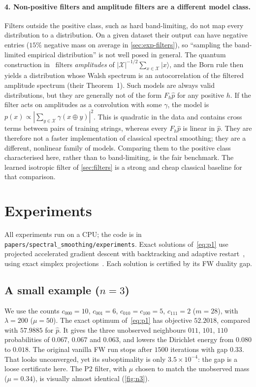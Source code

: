 \documentclass[11pt]{article}
\theoremstyle{definition}
\theoremstyle{remark}
\newcommand{\X}{\mathcal{X}}
\newcommand{\hp}{\hat p}
\begin{document}
\paragraph{4. Non-positive filters and amplitude filters are a different model class.}
Filters outside the positive class, such as hard band-limiting, do not map every distribution to a distribution. On a given dataset their output can have negative entries ($15\%$ negative mass on average in \cref{sec:exp-filters}), so ``sampling the band-limited empirical distribution'' is not well posed in general. The quantum construction in~\cite{belis2026spectral} filters \emph{amplitudes} of $|\X|^{-1/2}\sum_{x\in\X}|x\rangle$, and the Born rule then yields a distribution whose Walsh spectrum is an autocorrelation of the filtered amplitude spectrum (their Theorem~1). Such models are always valid distributions, but they are generally not of the form $F_h\hp$ for any positive $h$. If the filter acts on amplitudes as a convolution with some $\gamma$, the model is $p(x)\propto|\sum_{y\in\X}\gamma(x\oplus y)|^2$. This is quadratic in the data and contains cross terms between pairs of training strings, whereas every $F_h\hp$ is linear in $\hp$. They are therefore not a faster implementation of classical spectral smoothing; they are a different, nonlinear family of models. Comparing them to the positive class characterised here, rather than to band-limiting, is the fair benchmark. The learned isotropic filter of \cref{sec:filters} is a strong and cheap classical baseline for that comparison.

\section{Experiments}
\label{sec:experiments}

All experiments run on a CPU; the code is in \texttt{papers/spectral\_smoothing/experiments}. Exact solutions of~\eqref{eq:p1} use projected accelerated gradient descent with backtracking and adaptive restart~\cite{beck2009fista,odonoghue2015restart}, using exact simplex projections~\cite{duchi2008projection}. Each solution is certified by its FW duality gap.

\subsection{A small example ($n=3$)}\label{sec:exp-small}

We use the counts $c_{000}=10$, $c_{001}=6$, $c_{010}=c_{100}=5$, $c_{111}=2$ ($m=28$), with $\lambda=200$ ($\mu=50$). The exact optimum of~\eqref{eq:p1} has objective $52.2018$, compared with $57.9885$ for $\hp$. It gives the three unobserved neighbours $011$, $101$, $110$ probabilities of $0.067$, $0.067$ and $0.063$, and lowers the Dirichlet energy from $0.080$ to $0.018$. The original vanilla FW run stops after $1500$ iterations with gap $0.33$. That looks unconverged, yet its suboptimality is only $3.5\times10^{-4}$: the gap is a loose certificate here. The P2 filter, with $\mu$ chosen to match the unobserved mass ($\mu=0.34$), is visually almost identical (\cref{fig:n3}).
\end{document}
